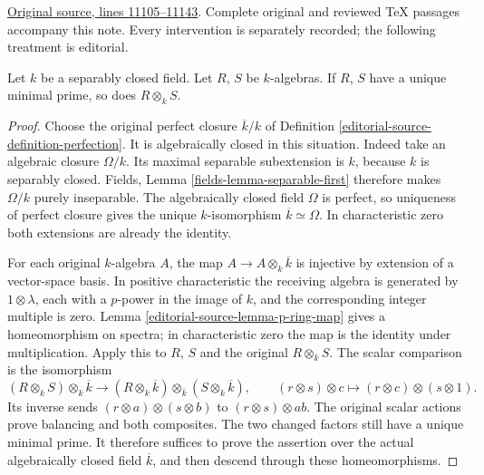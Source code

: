 \hypertarget{algebra-context-137}{}

\noindent\href{https://github.com/stacks/stacks-project/blob/a04446e57ec1fbc252a871afcec7752fb2807b14/algebra.tex\#L11105}{Original source, lines 11105--11143}. Complete original and reviewed TeX passages accompany this note. Every intervention is separately recorded; the following treatment is editorial.


\begin{lemma}
\label{editorial-source-lemma-separably-closed-irreducible}
Let $k$ be a separably closed field.
Let $R$, $S$ be $k$-algebras. If $R$, $S$ have a unique
minimal prime, so does $R \otimes_k S$.
\end{lemma}

\begin{proof}
Choose the original perfect closure
$\overline k/k$ of Definition
\ref{editorial-source-definition-perfection}. It is
algebraically closed in this situation.
Indeed take an algebraic closure
$\Omega/k$. Its maximal separable
subextension is $k$, because $k$
is separably closed. Fields, Lemma
\ref{fields-lemma-separable-first}
therefore makes $\Omega/k$ purely
inseparable. The algebraically
closed field $\Omega$ is perfect,
so uniqueness of perfect closure
gives the unique $k$-isomorphism
$\overline k\simeq\Omega$.
In characteristic zero both
extensions are already the identity.

For each original $k$-algebra $A$,
the map $A\to A\otimes_k\overline k$
is injective by extension of a
vector-space basis. In positive
characteristic the receiving algebra
is generated by $1\otimes\lambda$,
each with a $p$-power in the image
of $k$, and the corresponding
integer multiple is zero.
Lemma \ref{editorial-source-lemma-p-ring-map} gives
a homeomorphism on spectra; in
characteristic zero the map is
the identity under multiplication.
Apply this to $R$, $S$ and the
original $R\otimes_k S$.
The scalar comparison is the
isomorphism
$$
(R\otimes_k S)\otimes_k\overline k
\longrightarrow
(R\otimes_k\overline k)\otimes_{\overline k}
(S\otimes_k\overline k),
\qquad
(r\otimes s)\otimes c\longmapsto
(r\otimes c)\otimes(s\otimes1).
$$
Its inverse sends
$(r\otimes a)\otimes(s\otimes b)$
to $(r\otimes s)\otimes ab$.
The original scalar actions prove
balancing and both composites.
The two changed factors still
have a unique minimal prime.
It therefore suffices to prove
the assertion over the actual
algebraically closed field
$\overline k$, and then descend
through these homeomorphisms.


\end{proof}
